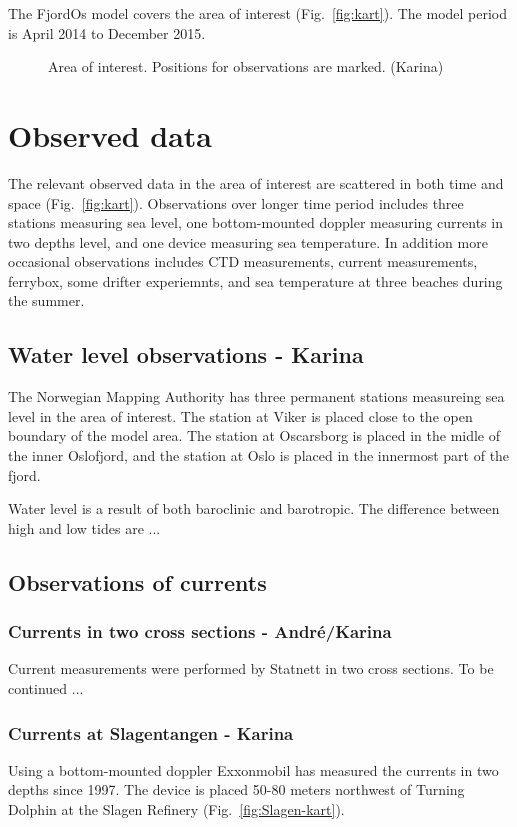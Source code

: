 \documentclass[12pt,a4paper,english]{article}
\begin{document}
The FjordOs model covers the area of interest (Fig.~\ref{fig:kart}). The model period is April 2014 to December 2015.

\begin{figure}[t]
\centerline{
}
\caption{\small
Area of interest. Positions for observations are marked. (Karina)
}
\label{fig:kart_obs}
\end{figure}

\section{Observed data}
The relevant observed data in the area of interest are scattered in both time and space (Fig.~\ref{fig:kart}). Observations over longer time period includes three stations measuring sea level, one bottom-mounted doppler measuring currents in two depths level, and one device measuring sea temperature. In addition more occasional observations includes CTD measurements, current measurements, ferrybox, some drifter experiemnts, and sea temperature at three beaches during the summer.  

\subsection{Water level observations - Karina}
The Norwegian Mapping Authority has three permanent stations measureing sea level in the area of interest. The station at Viker is placed close to the open boundary of the model area. The station at Oscarsborg is placed in the midle of the inner Oslofjord, and the station at Oslo is placed in the innermost part of the fjord.

Water level is a result of both baroclinic and barotropic. The difference between high and low tides are ...	

\subsection{Observations of currents}

\subsubsection{Currents in two cross sections - Andr\'{e}/Karina}
Current measurements were performed by Statnett in two cross sections. To be continued ...


\subsubsection{Currents at Slagentangen - Karina}
Using a bottom-mounted doppler Exxonmobil has measured the currents in two depths since 1997. The device is placed 50-80 meters northwest of Turning Dolphin at the Slagen Refinery (Fig.~\ref{fig:Slagen-kart}). 
\end{document}
